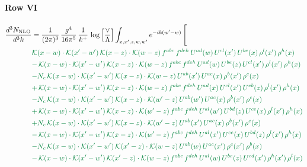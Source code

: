 \documentclass[10pt]{article}
\numberwithin{equation}{section}
\begin{document}
\paragraph{Row VI}
\begin{align}
\frac{d^{3}N_{\mathrm{NLO}}}{d^{3}k} & = \frac{1}{(2\pi)^{3}}\,\frac{g^{4}}{16\pi^{5}}\,\frac{1}{k^{+}}\,\log\Big[\frac{\vee}{\Lambda}\Big]\int_{x,x',z,w,w'}e^{-ik(w'-w)}\,\Bigg[\notag\\ &{\color{JIM} \mathcal{K}(x-w)\cdot\mathcal{K}(x'-w')\,\mathcal{K}(x-z)\cdot\mathcal{K}(w-z)\,f^{abc}\,f^{deh}\,U^{ad}(w)\,U^{cl}(x')\,U^{be}(x)\,\rho^{l}(x')\,\rho^{h}(x)} \notag\\
&{\color{JIM} -\,\mathcal{K}(x-w)\cdot\mathcal{K}(x'-w')\,\mathcal{K}(x-z)\cdot\mathcal{K}(w-z)\,f^{abc}\,f^{deh}\,U^{ad}(w)\,U^{be}(z)\,U^{cl}(x')\,\rho^{l}(x')\,\rho^{h}(x)} \notag\\
&{\color{JIM} -N_{c}\,\mathcal{K}(x-w)\cdot\mathcal{K}(x'-w')\,\mathcal{K}(x-z)\cdot\mathcal{K}(w-z)\,U^{ab}(x')\,U^{ac}(x)\,\rho^{b}(x')\,\rho^{c}(x)} \notag\\
&{\color{JIM} +\,\mathcal{K}(x-w)\cdot\mathcal{K}(x'-w')\,\mathcal{K}(x-z)\cdot\mathcal{K}(w-z)\,f^{abc}\,f^{deh}\,U^{ad}(x)\,U^{cl}(x')\,U^{eb}(z)\,\rho^{l}(x')\,\rho^{h}(x)} \notag\\
&{\color{JIM} -N_{c}\,\mathcal{K}(x-w)\cdot\mathcal{K}(x'-w')\,\mathcal{K}(x-z)\cdot\mathcal{K}(w'-z)\,U^{ab}(w')\,U^{ac}(x)\,\rho^{b}(x')\,\rho^{c}(x)} \notag\\
&{\color{JIM} +\,\mathcal{K}(x-w)\cdot\mathcal{K}(x'-w')\,\mathcal{K}(x-z)\cdot\mathcal{K}(w'-z)\,f^{abc}\,f^{deh}\,U^{al}(w')\,U^{bd}(z)\,U^{ce}(x)\,\rho^{l}(x')\,\rho^{h}(x)} \notag\\
&{\color{JIM} +N_{c}\,\mathcal{K}(x-w)\cdot\mathcal{K}(x'-w')\,\mathcal{K}(x-z)\cdot\mathcal{K}(w'-z)\,U^{ab}(x')\,U^{ac}(x)\,\rho^{b}(x')\,\rho^{c}(x)} \notag\\
&{\color{JIM} -\,\mathcal{K}(x-w)\cdot\mathcal{K}(x'-w')\,\mathcal{K}(x-z)\cdot\mathcal{K}(w'-z)\,f^{abc}\,f^{deh}\,U^{al}(x')\,U^{ce}(x)\,U^{bd}(z)\,\rho^{l}(x')\,\rho^{h}(x)} \notag\\
&{\color{JIM} -N_{c}\,\mathcal{K}(x-w)\cdot\mathcal{K}(x'-w')\,\mathcal{K}(x'-z)\cdot\mathcal{K}(w-z)\,U^{ab}(w)\,U^{ac}(x')\,\rho^{c}(x')\,\rho^{b}(x)} \notag\\
&{\color{JIM} -\,\mathcal{K}(x-w)\cdot\mathcal{K}(x'-w')\,\mathcal{K}(x'-z)\cdot\mathcal{K}(w-z)\,f^{abc}\,f^{deh}\,U^{al}(w)\,U^{be}(z)\,U^{cd}(x')\,\rho^{h}(x')\,\rho^{l}(x)} \notag\\

\end{align}
\end{document}
